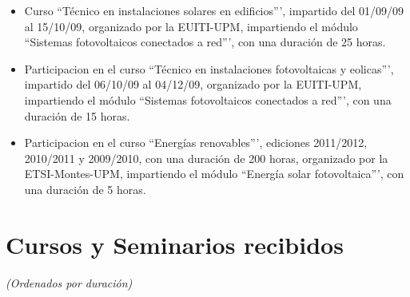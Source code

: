 \documentclass[article, a4paper]{memoir}
\begin{document}
\begin{itemize}
\item Curso ``Técnico en instalaciones solares en edificios''',
impartido del 01/09/09 al 15/10/09, organizado por la
EUITI-UPM, impartiendo el módulo ``Sistemas fotovoltaicos
conectados a red''', con una duración de 25 horas.

\item Participacion en el curso ``Técnico en instalaciones
fotovoltaicas y eolicas''', impartido del 06/10/09 al 04/12/09,
organizado por la EUITI-UPM, impartiendo el módulo ``Sistemas
fotovoltaicos conectados a red''', con una duración de 15 horas.

\item Participacion en el curso ``Energías renovables''', ediciones
2011/2012, 2010/2011 y 2009/2010, con una duración de 200
horas, organizado por la ETSI-Montes-UPM, impartiendo el módulo
``Energía solar fotovoltaica''', con una duración de 5 horas.
\end{itemize}



\section{Cursos y Seminarios recibidos}
\label{sec-9}

\emph{(Ordenados por duración)}
\end{document}
